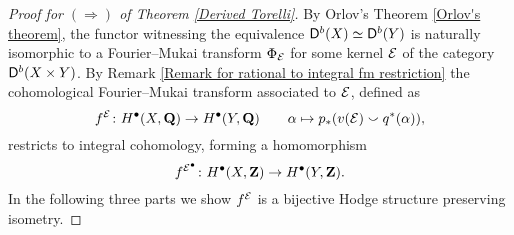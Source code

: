
\begin{proof}[Proof for $(\Rightarrow)$ of Theorem \ref{Derived Torelli}]
    By Orlov's Theorem \ref{Orlov's theorem}, the functor witnessing the equi\-valence $\mathsf{D}^b(X) \simeq \mathsf{D}^b(Y)$ is naturally isomorphic to a Fourier--Mukai transform $\Phi_{\mathcal E}$ for some kernel $\mathcal E$ of the category $\mathsf{D}^b(X \times Y)$. 
    By Remark \ref{Remark for rational to integral fm restriction} the cohomological Fourier--Mukai transform associated to $\mathcal E$, defined as
     \[
        f^{\mathcal E} \colon H^\bullet(X, \mathbf Q) \to H^\bullet(Y, \mathbf Q) \qquad \alpha \mapsto p_*(v(\mathcal E) \smallsmile q^*(\alpha)),
    \]
    restricts to integral cohomology, forming a homomorphism
    \[
        f^{\mathcal E^\bullet} \colon H^\bullet(X, \mathbf Z) \to H^\bullet(Y, \mathbf Z).
    \]
    In the following three parts we show $f^{\mathcal E}$ is a bijective Hodge structure preserving isometry.
    

\end{proof}
